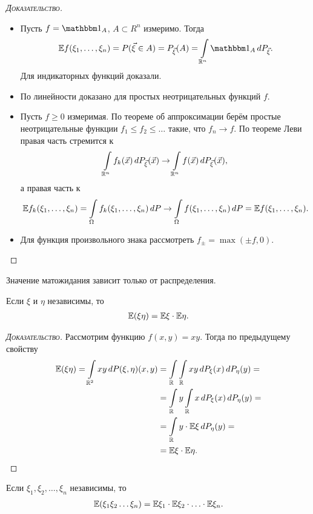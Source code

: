 \documentclass[../main.tex]{subfiles}
\begin{document}
\begin{proof}[\normalfont\textsc{Доказательство}]\
 \begin{itemize}
  \item Пусть $ f = \Ind_A $, $ A \subset R^{n} $ измеримо. Тогда
   \begin{align*}
    \E f (\xi_1, \ldots, \xi_n) = P(\vec\xi \in A) = P_{\vec\xi}(A) = \int\limits_{\R^{n}} \Ind_A\,dP_{\vec\xi}.
   \end{align*}  Для индикаторных функций доказали.
  \item По линейности доказано для простых неотрицательных функций $ f $.
  \item Пусть $ f \geqslant 0 $ измеримая. По теореме об аппроксимации берём простые неотрицательные функции $ f_1 \leqslant f_2 \leqslant \ldots $ такие, что $ f_n \to f $. По теореме Леви правая часть стремится к
   \begin{align*}
    \int\limits_{\mathbb{R}^{n}} f_k(\vec x)  \,dP_{\vec\xi}(\vec x) \to \int\limits_{\mathbb{R}^{n}} f(\vec x)\,dP_{\vec\xi} (\vec x),
   \end{align*} а правая часть к
   \begin{align*}
    \mathbb E f_k (\xi_1, \ldots, \xi_n) = \int\limits_{\Omega} f_k(\xi_1, \ldots, \xi_n) \,dP \to \int\limits_{\Omega} f(\xi_1, \ldots, \xi_n)\,dP = \mathbb E f(\xi_1, \ldots, \xi_n).
   \end{align*} 
  \item Для функция произвольного знака рассмотреть $ f_\pm = \max(\pm f, 0) $.
 \end{itemize}
\end{proof}
\begin{crly*}
 Значение матожидания зависит только от распределения.
\end{crly*}
\begin{prop}
 \label{proposition:independent_expected_product}
 Если $ \xi $ и $ \eta $ независимы, то
 \begin{align*}
  \mathbb E(\xi \eta) = \mathbb E\xi \cdot \mathbb E\eta.
 \end{align*} 
\end{prop}
\begin{proof}[\normalfont\textsc{Доказательство}]
 Рассмотрим функцию $ f(x,y) = xy $. Тогда по предыдущему свойству
 \begin{align*}
  \mathbb E(\xi\eta) = \int\limits_{\mathbb{R}^{2}} xy \,dP{(\xi,\eta)} (x,y) &= \int\limits_{\mathbb{R}} \int\limits_{\mathbb{R}} xy\,dP_{\xi}(x)\,dP_{\eta}(y) = \\
  &= \int\limits_{\mathbb{R}} y \int\limits_{\mathbb{R}} x\,dP_{\xi}(x)\,dP_{\eta}(y) = \\
  &= \int\limits_{\mathbb{R}} y \cdot \mathbb E\xi\,dP_{\eta}(y) = \\
  &= \mathbb E\xi \cdot \mathbb E\eta.
 \end{align*} 
\end{proof}
\begin{prop*}
 Если $ \xi_1,\xi_2, \ldots, \xi_n $ независимы, то
 \begin{align*}
  \mathbb E(\xi_1 \xi_2 \ldots \xi_n) = \mathbb E\xi_1 \cdot \mathbb E\xi_2 \cdot \ldots \cdot \mathbb E\xi_n.
 \end{align*} 
\end{prop*}
\end{document}
